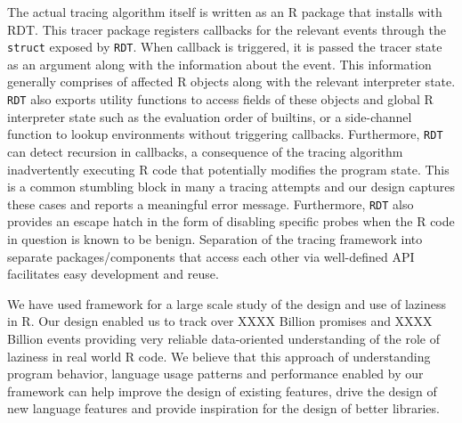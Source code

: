\documentclass{article}
\begin{document}
The actual tracing algorithm itself is written as an R package that installs
with RDT. This tracer package registers callbacks for the relevant events
through the \texttt{struct} exposed by \texttt{RDT}. When callback is triggered,
it is passed the tracer state as an argument along with the information about
the event. This information generally comprises of affected R objects along with
the relevant interpreter state. \texttt{RDT} also exports utility functions to
access fields of these objects and global R interpreter state such as the
evaluation order of builtins, or a side-channel function to lookup environments
without triggering callbacks. Furthermore, \texttt{RDT} can detect recursion in
callbacks, a consequence of the tracing algorithm inadvertently executing R code
that potentially modifies the program state. This is a common stumbling block in
many a tracing attempts and our design captures these cases and reports a
meaningful error message. Furthermore, \texttt{RDT} also provides an escape
hatch in the form of disabling specific probes when the R code in question is
known to be benign. Separation of the tracing framework into separate
packages/components that access each other via well-defined API facilitates easy
development and reuse.

We have used framework for a large scale study of the design and use of
laziness in R. Our design enabled us to track over XXXX Billion promises and
XXXX Billion events providing very reliable data-oriented understanding of
the role of laziness in real world R code. We believe that this approach of
understanding program behavior, language usage patterns and performance enabled
by our framework can help improve the design of existing features, drive the
design of new language features and provide inspiration for the design of better
libraries.
\end{document}
